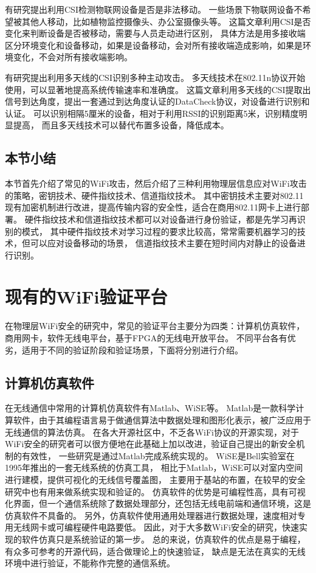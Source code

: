 		有研究提出利用CSI检测物联网设备是否是非法移动\cite{acsac15iot}。
		一些场景下物联网设备不希望被其他人移动，比如植物监控摄像头、办公室摄像头等。
		这篇文章利用CSI是否变化来判断设备是否被移动，需要与人员走动进行区别，
		具体方法是用多接收端区分环境变化和设备移动，如果是设备移动，会对所有接收端造成影响，如果是环境变化，不会对所有接收端影响。

		有研究提出利用多天线的CSI识别多种主动攻击\cite{mobicom13securearray}。
		多天线技术在802.11n协议开始使用，可以显著地提高系统传输速率和准确度。
		这篇文章利用多天线的CSI提取出信号到达角度，提出一套通过到达角度认证的DataCheck协议，对设备进行识别和认证。
		可以识别相隔5厘米的设备，相对于利用RSSI的识别距离5米\cite{wisec06spoofing}，识别精度明显提高，
		而且多天线技术可以替代布置多设备，降低成本。

		\subsection{本节小结}
		本节首先介绍了常见的WiFi攻击，然后介绍了三种利用物理层信息应对WiFi攻击的策略，密钥技术、硬件指纹技术、信道指纹技术。
		其中密钥技术主要对802.11现有加密机制进行改进，提高传输内容的安全性，适合在商用802.11网卡上进行部署。
		硬件指纹技术和信道指纹技术都可以对设备进行身份验证，都是先学习再识别的模式，
		其中硬件指纹技术对学习过程的要求比较高，常常需要机器学习的技术，但可以应对设备移动的场景，
		信道指纹技术主要在短时间内对静止的设备进行识别。

	\section{现有的WiFi验证平台}\label{sec:related_work}
	在物理层WiFi安全的研究中，常见的验证平台主要分为四类：计算机仿真软件，商用网卡，软件无线电平台，基于FPGA的无线电开放平台。
	不同平台各有优劣，适用于不同的验证阶段和验证场景，下面将分别进行介绍。

		\subsection{计算机仿真软件}
		在无线通信中常用的计算机仿真软件有Matlab、WiSE等。
		Matlab是一款科学计算软件，由于其编程语言易于做通信算法中数据处理和图形化表示，被广泛应用于无线通信的算法仿真。
		在各大开源社区中，不乏各WiFi协议的开源实现，对于WiFi安全的研究者可以很方便地在此基础上加以改进，验证自己提出的新安全机制的有效性，
		一些研究是通过Matlab完成系统实现的\cite{globecom14key, icnc13cognitive, infocom14relay}。
		WiSE是Bell实验室在1995年推出的一套无线系统的仿真工具\cite{bell95wise}，
		相比于Matlab，WiSE可以对室内空间进行建模，提供可视化的无线信号覆盖图，
		主要用于基站的布置，在较早的安全研究中也有用来做系统实现和验证的\cite{icc07xiao}。
		仿真软件的优势是可编程性高，具有可视化界面，但一个通信系统除了数据处理部分，还包括无线电前端和通信环境，这是仿真软件不具备的。
		另外，仿真软件使用通用处理器进行数据处理，速度相对专用无线网卡或可编程硬件电路要低。
		因此，对于大多数WiFi安全的研究，快速实现的软件仿真只是系统验证的第一步。
		总的来说，仿真软件的优点是易于编程，有众多可参考的开源代码，适合做理论上的快速验证，
		缺点是无法在真实的无线环境中进行验证，不能称作完整的通信系统。

